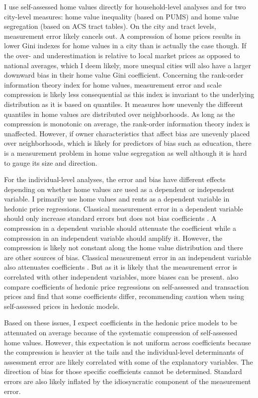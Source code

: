 I use self-assessed home values directly for household-level analyses and for two city-level measures: home value inequality (based on PUMS) and home value segregation (based on ACS tract tables). On the city and tract levels, measurement error likely cancels out. A compression of home prices results in lower Gini indexes for home values in a city than is actually the case though. If the over- and underestimation is relative to local market prices as opposed to national averages, which I deem likely, more unequal cities will also have a larger downward bias in their home value Gini coefficient. Concerning the rank-order information theory index for home values, measurement error and scale compression is likely less consequential as this index is invariant to the underlying distribution as it is based on quantiles. It measures how unevenly the different quantiles in home values are distributed over neighborhoods. As long as the compression is monotonic on average, the rank-order information theory index is unaffected. However, if owner characteristics that affect bias are unevenly placed over neighborhoods, which is likely for predictors of bias such as education, there is a measurement problem in home value segregation as well although it is hard to gauge its size and direction.

For the individual-level analyses, the error and bias have different effects depending on whether home values are used as a dependent or independent variable. I primarily use home values and rents as a dependent variable in hedonic price regressions. Classical measurement error in a dependent variable should only increase standard errors but does not bias coefficients \citep[318f]{wooldridgeIntroductoryEconometricsModern2013}. A compression in a dependent variable should attenuate the coefficient while a compression in an independent variable should amplify it. However, the compression is likely not constant along the home value distribution and there are other sources of bias. Classical measurement error in an independent variable also attenuates coefficients \citep[320ff]{wooldridgeIntroductoryEconometricsModern2013}. But as it is likely that the measurement error is correlated with other independent variables, more biases can be present. \citet{dreesenAccuracyHomeownersValuations2023} also compare coefficients of hedonic price regressions on self-assessed and transaction prices and find that some coefficients differ, recommending caution when using self-assessed prices in hedonic models. 

Based on these issues, I expect coefficients in the hedonic price models to be attenuated on average because of the systematic compression of self-assessed home values. However, this expectation is not uniform across coefficients because the compression is heavier at the tails and the individual-level determinants of assessment error are likely correlated with some of the explanatory variables. The direction of bias for those specific coefficients cannot be determined. Standard errors are also likely inflated by the idiosyncratic component of the measurement error.

